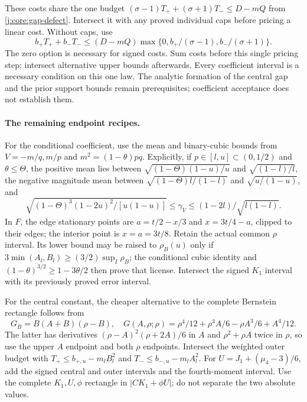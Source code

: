 These costs share the one budget
$(\sigma-1)T_++(\sigma+1)T_-\le D-mQ$ from
\eqref{j:core:gap-defect}. Intersect it with any proved individual
caps before pricing a linear cost. Without caps, use
\[
 b_+T_++b_-T_-\le(D-mQ)
 \max\{0,b_+/(\sigma-1),b_-/(\sigma+1)\}.
\]
The zero option is necessary for signed costs. Sum costs before this
single pricing step; intersect alternative upper bounds afterwards.
Every coefficient interval is a necessary condition on this one law.
The analytic formation of the central gap and the prior support bounds
remain prerequisites; coefficient acceptance does not establish them.

\paragraph{The remaining endpoint recipes.}
For the conditional coefficient, use the mean and binary-cubic bounds
from $V=-m/q,m/p$ and $m^2=(1-\theta)pq$. Explicitly, if
$p\in[l,u]\subset(0,1/2)$ and $\theta\le\Theta$, the positive mean
lies between $\sqrt{(1-\Theta)(1-u)/u}$ and $\sqrt{(1-l)/l}$,
the negative magnitude mean between $\sqrt{(1-\Theta)l/(1-l)}$ and
$\sqrt{u/(1-u)}$, and
\[
 \sqrt{(1-\Theta)^3(1-2u)^2/[u(1-u)]}
 \le\gamma_V\le(1-2l)/\sqrt{l(1-l)}.
\]
In $F$, the edge stationary points are
$a=t/2-x/3$ and $x=3t/4-a$, clipped to their edges; the interior
point is $x=a=3t/8$. Retain the actual common $\rho$ interval.
Its lower bound may be raised to $\rho_B(u)$ only if
$3\min(A_l,B_l)\ge(3/2)\sup_I\rho_B$; the conditional cubic identity
and $(1-\theta)^{3/2}\ge1-3\theta/2$ then prove that license.
Intersect the signed $K_1$ interval with its previously proved error interval.

For the central constant, the cheaper alternative to the complete Bernstein
rectangle follows from
\[
 G_B=B(A+B)(\rho-B),\quad
 G(A,\rho;\rho)=\rho^4/12+\rho^3A/6-\rho A^3/6+A^4/12.
\]
The latter has derivatives $(\rho-A)^2(\rho+2A)/6$ in $A$ and
$\rho^2+\rho A$ twice in $\rho$, so use the upper $A$ endpoint and
both $\rho$ endpoints. Intersect the weighted outer budget with
$T_+\le b_{+,u}-m_lB_l^2$ and $T_-\le b_{-,u}-m_lA_l^2$.
For $U=J_1+(\mu_4-3)/6$, add the signed central and outer intervals
and the fourth-moment interval. Use the complete $K_1,U,\phi$ rectangle
in $|CK_1+\phi U|$; do not separate the two absolute values.

